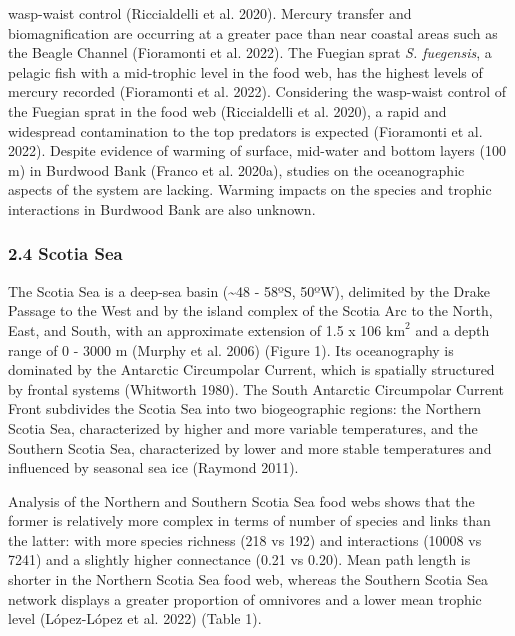 \documentclass[
]{article}
\begin{document}
wasp-waist control (Riccialdelli et al. 2020). Mercury transfer and
biomagnification are occurring at a greater pace than near coastal areas
such as the Beagle Channel (Fioramonti et al. 2022). The Fuegian sprat
\emph{S. fuegensis}, a pelagic fish with a mid-trophic level in the food
web, has the highest levels of mercury recorded (Fioramonti et al.
2022). Considering the wasp-waist control of the Fuegian sprat in the
food web (Riccialdelli et al. 2020), a rapid and widespread
contamination to the top predators is expected (Fioramonti et al. 2022).
Despite evidence of warming of surface, mid-water and bottom layers (100
m) in Burdwood Bank (Franco et al. 2020a), studies on the oceanographic
aspects of the system are lacking. Warming impacts on the species and
trophic interactions in Burdwood Bank are also unknown.

\subsubsection{2.4 Scotia Sea}\label{scotia-sea}

The Scotia Sea is a deep-sea basin (\textasciitilde48 - 58ºS, 50ºW),
delimited by the Drake Passage to the West and by the island complex of
the Scotia Arc to the North, East, and South, with an approximate
extension of 1.5 x 106 \(\text{km}^2\) and a depth range of 0 - 3000 m
(Murphy et al. 2006) (Figure 1). Its oceanography is dominated by the
Antarctic Circumpolar Current, which is spatially structured by frontal
systems (Whitworth 1980). The South Antarctic Circumpolar Current Front
subdivides the Scotia Sea into two biogeographic regions: the Northern
Scotia Sea, characterized by higher and more variable temperatures, and
the Southern Scotia Sea, characterized by lower and more stable
temperatures and influenced by seasonal sea ice (Raymond 2011).

Analysis of the Northern and Southern Scotia Sea food webs shows that
the former is relatively more complex in terms of number of species and
links than the latter: with more species richness (218 vs 192) and
interactions (10008 vs 7241) and a slightly higher connectance (0.21 vs
0.20). Mean path length is shorter in the Northern Scotia Sea food web,
whereas the Southern Scotia Sea network displays a greater proportion of
omnivores and a lower mean trophic level (López-López et al. 2022)
(Table 1).
\end{document}
